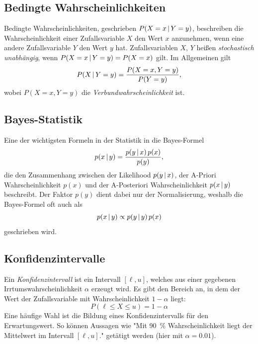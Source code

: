 		\subsection{Bedingte Wahrscheinlichkeiten}
			Bedingte Wahrscheinlichkeiten, geschrieben \( P(X = x \,\vert\, Y = y) \), beschreiben die Wahrscheinlichkeit einer Zufallsvariable \(X\) den Wert \(x\) anzunehmen, wenn eine andere Zufallsvariable \(Y\) den Wert \(y\) hat. Zufallsvariablen \(X\), \(Y\) heißen \emph{stochastisch unabhängig}, wenn \( P(X = x \,\vert\, Y = y) = P(X = x) \) gilt. Im Allgemeinen gilt
			\begin{equation}
				P(X \,\vert\, Y = y) = \frac{P(X = x, Y = y)}{P(Y = y)},
			\end{equation}
			wobei \( P(X = x, Y = y) \) die \emph{Verbundwahrscheinlichkeit} ist.

		\subsection{Bayes-Statistik}
			Eine der wichtigsten Formeln in der Statistik in die Bayes-Formel
			\begin{equation}
				p(x \,\vert\, y) = \frac{p(y \,\vert\, x) \, p(x)}{p(y)},
			\end{equation}
			die den Zusammenhang zwischen der Likelihood \( p(y \,\vert\, x) \), der A-Priori Wahrscheinlichkeit \( p(x) \) und der A-Posteriori Wahrscheinlichkeit \( p(x \,\vert\, y) \) beschreibt. Der Faktor \( p(y) \) dient dabei nur der Normalisierung, weshalb die Bayes-Formel oft auch als
			\begin{equation}
				p(x \,\vert\, y) \propto p(y \,\vert\, y) \, p(x)
			\end{equation}
			geschrieben wird.

		\subsection{Konfidenzintervalle}
			Ein \emph{Konfidenzintervall} ist ein Intervall \( [\ell, u] \), welches aus einer gegebenen Irrtumswahrscheinlichkeit \(\alpha\) erzeugt wird. Es gibt den Bereich an, in dem der Wert der Zufallsvariable mit Wahrscheinlichkeit \( 1 - \alpha \) liegt:
			\begin{equation}
				P(\ell \leq X \leq u) = 1 - \alpha
			\end{equation}
			Eine häufige Wahl ist die Bildung eines Konfidenzintervalls für den Erwartungswert. So können Aussagen wie "Mit \SI{90}{\percent} Wahrscheinlichkeit liegt der Mittelwert im Intervall \( [\ell, u] \)." getätigt werden (hier mit \( \alpha = 0.01 \)).

